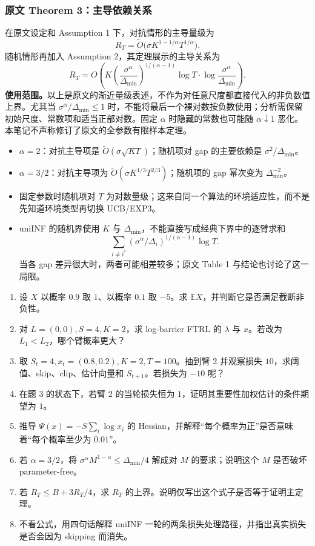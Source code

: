 \subsubsection{原文 Theorem 3：主导依赖关系}
在原文设定和 Assumption 1 下，对抗情形的主导量级为
\[
R_T=\widetilde O\bigl(\sigma K^{1-1/\alpha}T^{1/\alpha}\bigr).
\]
随机情形再加入 Assumption 2，其定理展示的主导关系为
\[
R_T=O\!\left(K\left(\frac{\sigma^\alpha}{\Delta_{\min}}\right)^{1/(\alpha-1)}
\log T\cdot\log\frac{\sigma^\alpha}{\Delta_{\min}}\right).
\]
\textbf{使用范围。}以上是原文的渐近量级表述，不作为对任意尺度都直接代入的非负数值上界。尤其当 $\sigma^\alpha/\Delta_{\min}\le1$ 时，不能将最后一个裸对数按负数使用；分析需保留初始尺度、常数项和适当正部对数。固定 $\alpha$ 时隐藏的常数也可能随 $\alpha\downarrow1$ 恶化。本笔记不声称修订了原文的全参数有限样本定理。

\begin{itemize}
\item $\alpha=2$：对抗主导项是 $\widetilde O(\sigma\sqrt{KT})$；随机项对 gap 的主要依赖是 $\sigma^2/\Delta_{\min}$。
\item $\alpha=3/2$：对抗主导项为 $\widetilde O(\sigma K^{1/3}T^{2/3})$；随机项的 gap 幂次变为 $\Delta_{\min}^{-2}$。
\item 固定参数时随机项对 $T$ 为对数量级；这来自同一个算法的环境适应性，而不是先知道环境类型再切换 UCB/EXP3。
\item uniINF 的随机界使用 $K$ 与 $\Delta_{\min}$，不能直接写成经典下界中的逐臂求和
\[
\sum_{i\ne i^*}(\sigma^\alpha/\Delta_i)^{1/(\alpha-1)}\log T.
\]
当各 gap 差异很大时，两者可能相差较多；原文 Table 1 与结论也讨论了这一局限。
\end{itemize}

\iffalse
\begin{enumerate}
\item 设 $X$ 以概率 $0.9$ 取 $1$、以概率 $0.1$ 取 $-5$。求 $\mathbb EX$，并判断它是否满足截断非负性。
\item 对 $L=(0,0),S=4,K=2$，求 log-barrier FTRL 的 $\lambda$ 与 $x$。若改为 $L_1<L_2$，哪个臂概率更大？
\item 取 $S_t=4,x_t=(0.8,0.2),K=2,T=100$。抽到臂 2 并观察损失 $10$，求阈值、skip、clip、估计向量和 $S_{t+1}$。若损失为 $-10$ 呢？
\item 在题 3 的状态下，若臂 2 的当轮损失恒为 $1$，证明其重要性加权估计的条件期望为 $1$。
\item 推导 $\Psi(x)=-S\sum_i\log x_i$ 的 Hessian，并解释“每个概率为正”是否意味着“每个概率至少为 $0.01$”。
\item 若 $\alpha=3/2$，将 $\sigma^\alpha M^{1-\alpha}\le\Delta_{\min}/4$ 解成对 $M$ 的要求；说明这个 $M$ 是否破坏 parameter-free。
\item 若 $R_T\le B+3R_T/4$，求 $R_T$ 的上界。说明仅写出这个式子是否等于证明主定理。
\item 不看公式，用四句话解释 uniINF 一轮的两条损失处理路径，并指出真实损失是否会因为 skipping 而消失。
\end{enumerate}

